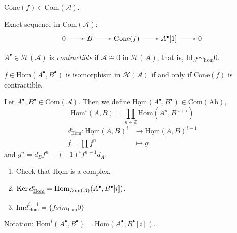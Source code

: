 \begin{exercise}
\label{exercise-cone-is-complex}
$\text{Cone}(f) \in \text{Com}(\mathcal{A})$.
\end{exercise}

Exact sequence in $\text{Com}(\mathcal{A})$:
$$
\xymatrix{
0\ar[r]&B\ar[r]&\text{Cone}(f)\ar[r]&A^{\bullet}[1]\ar[r]&0
}
$$
\begin{definition}
\label{definition-contractible-complex}
$A^\bullet \in \mathcal{H}(\mathcal{A})$ is {\it contractible} if $\mathcal{A}
\cong 0$ in $\mathcal{H}(\mathcal{A})$, that is,
$\text{Id}_{A^{\bullet}}\sim_{\text{hom}}0$.
\end{definition}

\begin{exercise}
\label{exercise-isomorphism-iff-cone-contractible}
$f \in \text{Hom}(A^{\bullet},B^{\bullet})$ is isomorphism in
$\mathcal{H}(\mathcal{A})$ if and only if $\text{Cone}(f)$ is contractible.
\end{exercise}

\begin{definition}
\label{definition-Hom-of-complexes}
Let  $A^{\bullet},B^{\bullet}\in \text{Com}(\mathcal{A})$. Then we define
$\underline{\text{Hom}}(A^{\bullet},B^{\bullet}) \in \text{Com}(\text{Ab})$,
$$
\text{Hom}^i(A,B)=\prod_{n \in \mathbb{Z}}\text{Hom}(A^n,B^{n+i})
$$
\begin{align*}
d^i_{\underline{\text{Hom}}}: \underline{\text{Hom}}(A,B)^i &\longrightarrow
\underline{\text{Hom}}(A,B)^{i+1} \\
f=\prod f^n &\longmapsto g
\end{align*}
and $g^n=d_Bf^n-(-1)^i f^{n+1}d_A$.
\end{definition}

\begin{exercise}
\label{exercise-Hom}
\begin{enumerate}
\item Check that $\underline{\text{Hom}}$ is a complex.
\item $\mathop{\mathrm{Ker}}
d^i_{\underline{\text{Hom}}}
=\text{Hom}_{\text{Com}(\mathcal{A})}(A^{\bullet},B^{\bullet}[i])$.
\item $\text{Im}d^{i-1}_{\text{Hom}}=\{fsim_{\text{hom}}0\}$
\end{enumerate}
\end{exercise}

Notation:
$\text{Hom}^i(A^{\bullet},B^{\bullet})=\text{Hom}(A^{\bullet},B^{\bullet}[i])$. 


